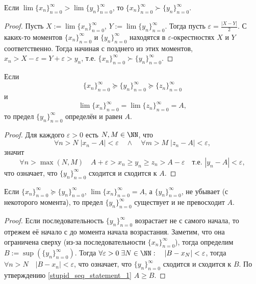 \documentclass[12pt,a4paper]{article}
\begin{document}
    \begin{statement}\label{stupid_seq_statement_2}
        Если $\lim \{x_n\}_{n=0}^\infty > \lim \{y_n\}_{n=0}^\infty$, то $\{x_n\}_{n=0}^\infty \succ \{y_n\}_{n=0}^\infty$.
    \end{statement}

    \begin{proof}
        Пусть $X := \lim \{x_n\}_{n=0}^\infty$, $Y := \lim \{y_n\}_{n=0}^\infty$. Тогда пусть $\varepsilon = \frac{|X - Y|}{2}$. С каких-то моментов $\{x_n\}_{n=0}^\infty$ и $\{y_n\}_{n=0}^\infty$ находятся в $\varepsilon$-окрестностях $X$ и $Y$ соответственно. Тогда начиная с позднего из этих моментов, $x_n > X - \varepsilon = Y + \varepsilon > y_n$, т.е. $\{x_n\}_{n=0}^\infty \succ \{y_n\}_{n=0}^\infty$.
    \end{proof}

    \begin{statement}\label{stupid_seq_statement_3}
        Если
        \[\{x_n\}_{n=0}^\infty \succcurlyeq \{y_n\}_{n=0}^\infty \succcurlyeq \{z_n\}_{n=0}^\infty\]
        и
        \[\lim \{x_n\}_{n=0}^\infty = \lim \{z_n\}_{n=0}^\infty = A,\]
        то предел $\{y_n\}_{n=0}^\infty$ определён и равен $A$.
    \end{statement}

    \begin{proof}
        Для каждого $\varepsilon > 0$ есть $N, M \in \NN$, что
        \[\forall n > N\; |x_n - A| < \varepsilon \quad \wedge \quad \forall m > M\; |z_n - A| < \varepsilon,\]
        значит
        \[\forall n > \max(N, M)\quad A + \varepsilon > x_n \geqslant y_n \geqslant z_n > A - \varepsilon \quad \text{т.е. } |y_n - A| < \varepsilon,\]
        что означает, что $\{y_n\}_{n=0}^\infty$ сходится и сходится к $A$.
    \end{proof}

    \begin{statement}
        Если $\{x_n\}_{n=0}^\infty \succcurlyeq \{y_n\}_{n=0}^\infty$, $\lim \{x_n\}_{n=0}^\infty = A$, а $\{y_n\}_{n=0}^\infty$, не убывает (с некоторого момента), то предел $\{y_n\}_{n=0}^\infty$ существует и не превосходит $A$.
    \end{statement}

    \begin{proof}
        Если последовательность $\{y_n\}_{n=0}^\infty$ возрастает не с самого начала, то отрежем её начало с до момента начала возрастания. Заметим, что она ограничена сверху (из-за последовательности $\{x_n\}_{n=0}^\infty$), тогда определим $B := \sup(\{y_n\}_{n=0}^\infty)$. Тогда $\forall \varepsilon > 0\; \exists N \in \NN:\quad |B-x_N| < \varepsilon$, тогда $\forall n > N\quad |B-x_n| < \varepsilon$, что означает, что $\{y_n\}_{n=0}^\infty$ сходится и сходится к $B$. По утверждению \ref{stupid_seq_statement_1} $A \geqslant B$.
    \end{proof}
\end{document}
